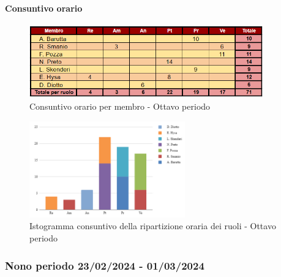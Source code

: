 \paragraph{Consuntivo orario}

\begin{figure}[H]
    \centering
    \includegraphics[width=0.9\textwidth]{../Images/consuntivoOrario8Periodo.png}
    \caption{Consuntivo orario per membro - Ottavo periodo}
    \label{fig:Constuntivo_orario_8}
\end{figure}

\begin{figure}[H]
    \centering
    \includegraphics[width=0.6\textwidth]{../Images/consuntivoDivisioneRuoli8Periodo.png}
    \caption{Istogramma consuntivo della ripartizione oraria dei ruoli - Ottavo periodo}
    \label{fig:Consuntivo_ripartizione_oraria_8}
\end{figure}


\subsubsection{Nono periodo  23/02/2024 - 01/03/2024}

